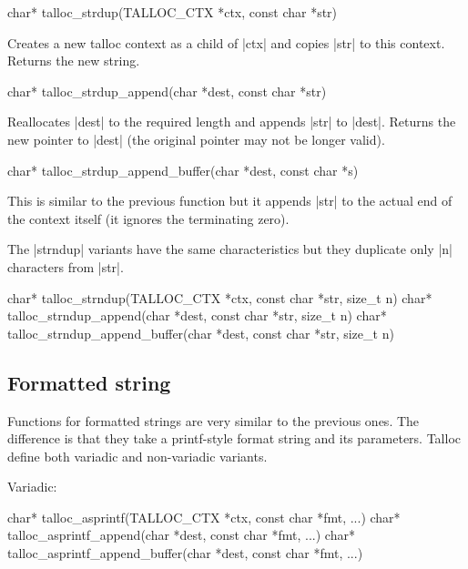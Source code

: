 \begin{funcproto}
char* talloc_strdup(TALLOC_CTX *ctx, const char *str)
\end{funcproto}
\begin{funcdesc}
  Creates a new talloc context as a child of |ctx| and copies |str| to
  this context. Returns the new string.
\end{funcdesc}
\begin{funcproto}
char* talloc_strdup_append(char *dest, const char *str)
\end{funcproto}
\begin{funcdesc}
  Reallocates |dest| to the required length and appends |str| to |dest|. Returns
  the new pointer to |dest| (the original pointer may not be longer valid).
\end{funcdesc}
\begin{funcproto}
char* talloc_strdup_append_buffer(char *dest, const char *s)
\end{funcproto}
\begin{funcdesc}
  This is similar to the previous function but it appends |str| to the actual
  end of the context itself (it ignores the terminating zero).
\end{funcdesc}
\funclistend
The |strndup| variants have the same characteristics but they duplicate only |n|
characters from |str|.

\begin{funcproto}
char* talloc_strndup(TALLOC_CTX *ctx, const char *str,
                     size_t n)
char* talloc_strndup_append(char *dest, const char *str,
                            size_t n)
char* talloc_strndup_append_buffer(char *dest, const char
                                   *str, size_t n)
\end{funcproto}

\subsection{Formatted string}

Functions for formatted strings are very similar to the previous ones. The
difference is that they take a printf-style format string and its parameters.
Talloc define both variadic and non-variadic variants.

Variadic:
\begin{funcproto}
char* talloc_asprintf(TALLOC_CTX *ctx, const char *fmt, ...)
char* talloc_asprintf_append(char *dest, const char *fmt,
                             ...)
char* talloc_asprintf_append_buffer(char *dest, const char
                                    *fmt, ...)
\end{funcproto}

